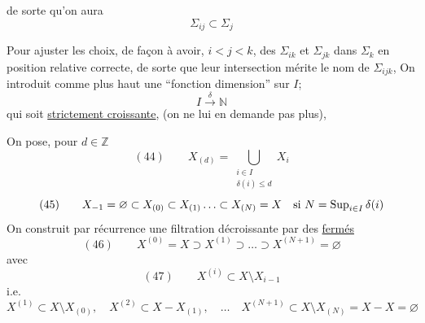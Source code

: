 de sorte qu'on aura
\[
\Sigma_{ij}\subset\Sigma_j
\]

Pour ajuster les choix, de façon à avoir,
$i<j<k$, des $\Sigma_{ik}$ et $\Sigma_{jk}$ dans $\Sigma_k$ en
position relative correcte, de sorte que leur intersection
mérite le nom de $\Sigma_{ijk}$,
On introduit comme plus haut une ``fonction dimension'' sur $I$;
\[
I\xrightarrow{\delta}\mathbb N
\]
qui soit \uline{strictement croissante}, 
(on ne lui en demande pas plus),

On pose, pour $d\in\mathbb Z$
\[
(44)\qquad X_{(d)}=\bigcup_{\substack{i\in I\\\delta(i)\leq d}}X_i
\]
\[
(45)\qquad X_{-1}=\varnothing\subset X_{(0)}\subset X_{(1)}\ldots
\subset X_{(N)}=X\quad\hbox{si }N=\operatorname{Sup}_{i\in I}\delta(i)
\]
On construit par récurrence une filtration décroissante par des
\uline{fermés}
\[
(46)\qquad X^{(0)}=X\supset X^{(1)}\supset\ldots\supset X^{(N+1)}=\varnothing
\]
avec
\[
(47)\qquad X^{(i)}\subset X\setminus X_{i-1}
\]
i.e.
\[
X^{(1)}\subset X\setminus X_{(0)},\quad
X^{(2)}\subset X-X_{(1)},\quad\ldots\quad
X^{(N+1)}\subset X\setminus X_{(N)}=X-X=\varnothing
\]
